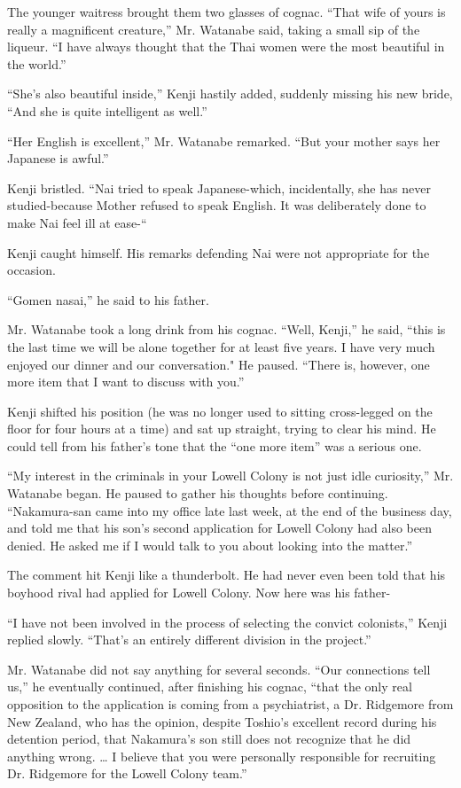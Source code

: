 \documentclass[]{article}
\begin{document}
{The younger waitress brought them two glasses of cognac.  “That wife of yours is really a magnificent creature,” Mr.  Watanabe said, taking a small sip of the liqueur.  “I have always thought that the Thai women were the most beautiful in the world.”

“She’s also beautiful inside,” Kenji hastily added, suddenly missing his new bride, “And she is quite intelligent as well.”

“Her English is excellent,” Mr.  Watanabe remarked.  “But your mother says her Japanese is awful.”

Kenji bristled.  “Nai tried to speak Japanese-which, incidentally, she has never studied-because Mother refused to speak English.  It was deliberately done to make Nai feel ill at ease-“

Kenji caught himself.  His remarks defending Nai were not appropriate for the occasion.

“Gomen nasai,” he said to his father.

Mr.  Watanabe took a long drink from his cognac.  “Well, Kenji,” he said, “this is the last time we will be alone together for at least five years.  I have very much enjoyed our dinner and our conversation."  He paused.  “There is, however, one more item that I want to discuss with you.”

Kenji shifted his position (he was no longer used to sitting cross-legged on the floor for four hours at a time) and sat up straight, trying to clear his mind.  He could tell from his father’s tone that the “one more item” was a serious one.

“My interest in the criminals in your Lowell Colony is not just idle curiosity,” Mr.  Watanabe began.  He paused to gather his thoughts before continuing.  “Nakamura-san came into my office late last week, at the end of the business day, and told me that his son’s second application for Lowell Colony had also been denied.  He asked me if I would talk to you about looking into the matter.”

The comment hit Kenji like a thunderbolt.  He had never even been told that his boyhood rival had applied for Lowell Colony.  Now here was his father-

“I have not been involved in the process of selecting the convict colonists,” Kenji replied slowly.  “That’s an entirely different division in the project.”

Mr.  Watanabe did not say anything for several seconds.  “Our connections tell us,” he eventually continued, after finishing his cognac, “that the only real opposition to the application is coming from a psychiatrist, a Dr.  Ridgemore from New Zealand, who has the opinion, despite Toshio’s excellent record during his detention period, that Nakamura’s son still does not recognize that he did anything wrong.  … I believe that you were personally responsible for recruiting Dr.  Ridgemore for the Lowell Colony team.”

}
\end{document}
